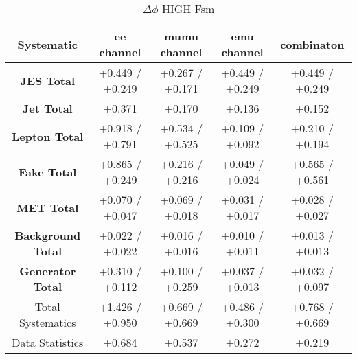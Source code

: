\begin{table}[htbp]
\scriptsize
  \begin{center} 
  \begin{tabular}{|c|c|c|c|c|}
  \hline
 Systematic                          &  ee channel&  mumu channel&  emu channel&  combinaton\\
 \hline
\textbf{JES Total}                    &+0.449   / +0.249   & +0.267   / +0.171   & +0.449   / +0.249   & +0.449   / +0.249  \\
\textbf{Jet Total}                    &+0.371              & +0.170              & +0.136              & +0.152             \\
\textbf{Lepton Total}                 &+0.918   / +0.791   & +0.534   / +0.525   & +0.109   / +0.092   & +0.210   / +0.194  \\
\textbf{Fake Total}                   &+0.865   / +0.249   & +0.216   / +0.216   & +0.049   / +0.024   & +0.565   / +0.561  \\
\textbf{MET Total}                    &+0.070   / +0.047   & +0.069   / +0.018   & +0.031   / +0.017   & +0.028   / +0.027  \\
\textbf{Background Total}             &+0.022   / +0.022   & +0.016   / +0.016   & +0.010   / +0.011   & +0.013   / +0.013  \\
\textbf{Generator Total}              &+0.310   / +0.112   & +0.100   / +0.259   & +0.037   / +0.013   & +0.032   / +0.097  \\
  \hline
  \hline
Total Systematics                     &+1.426   / +0.950   & +0.669   / +0.669   & +0.486   / +0.300   & +0.768   / +0.669  \\
Data Statistics                       &+0.684              & +0.537              & +0.272              & +0.219             \\
  \hline
  \end{tabular}
  \end{center} 
  \label{tab:fsm_nominal_deltaPhi_high}
  \caption{$\Delta\phi$ HIGH Fsm}
\end{table}


